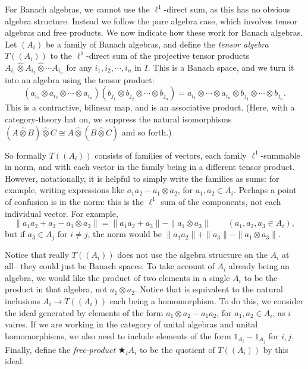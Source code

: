 \documentclass[a4paper,11pt]{article}
\newcommand{\proten}{\widehat\otimes}
\theoremstyle{definition}
\begin{document}
For Banach algebras, we cannot use the $\ell^1$-direct sum, as this has no obvious algebra structure.  Instead we follow the pure algebra case, which involves tensor algebras and free products.  We now indicate how these work for Banach algebras.  Let $(A_i)$ be a family of Banach algebras, and define the \emph{tensor algebra} $T((A_i))$ to the $\ell^1$-direct sum of the projective tensor products $A_{i_1}\proten A_{i_2}\proten\cdots A_{i_n}$ for any $i_1, i_2,\cdots,i_n$ in $I$.  This is a Banach space, and we turn it into an algebra using the tensor product:
\[ (a_{i_1}\otimes a_{i_2}\otimes\cdots\otimes a_{i_n})(b_{j_1}\otimes b_{j_2}\otimes\cdots\otimes b_{j_n})
= a_{i_1}\otimes\cdots\otimes a_{i_n} \otimes b_{j_1}\otimes\cdots\otimes b_{j_n}. \]
This is a contractive, bilinear map, and is an associative product.  (Here, with a category-theory hat on, we suppress the natural isomorphisms $(A\proten B)\proten C \cong A\proten(B\proten C)$ and so forth.)

So formally $T((A_i))$ consists of families of vectors, each family $\ell^1$-summable in norm, and with each vector in the family being in a different tensor product.  However, notationally, it is helpful to simply write the families as sums: for example, writing expressions like $a_1a_2 - a_1 \otimes a_2$, for $a_1,a_2\in A_i$.  Perhaps a point of confusion is in the norm: this is the $\ell^1$ sum of the components, not each individual vector.  For example,
\[ \| a_1a_2 + a_3 - a_1 \otimes a_3\| = \|a_1a_2 + a_3\| - \|a_1\otimes a_3\| \qquad (a_1,a_2,a_3\in A_i), \]
but if $a_3\in A_j$ for $i\not=j$, the norm would be $\|a_1a_2\| + \|a_3\| - \|a_1\otimes a_3\|$.

Notice that really $T((A_i))$ does not use the algebra structure on the $A_i$ at all-- they could just be Banach spaces.  To take account of $A_i$ already being an algebra, we would like the product of two elements in a single $A_i$ to be the product in that algebra, not $a_1\otimes a_2$.  Notice that is equivalent to the natural inclusions $A_i \to T((A_i))$ each being a homomorphism.  To do this, we consider the ideal generated by elements of the form $a_1\otimes a_2 - a_1a_2$, for $a_1,a_2\in A_i$, as $i$ vaires.  If we are working in the category of unital algebras and unital homomorphisms, we also need to include elements of the form $1_{A_i} - 1_{A_j}$ for $i,j$.  Finally, define the \emph{free-product} $\bigstar_i A_i$ to be the quotient of $T((A_i))$ by this ideal.
\end{document}
